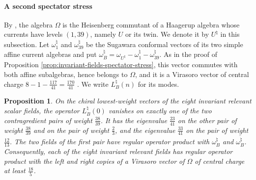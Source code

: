 \documentclass[leqno]{article}
\newtheorem{prop}[thm]{Proposition}
\numberwithin{equation}{section}
\begin{document}
\paragraph{A second spectator stress}
By \cite[Theorem 12.3(1) and (3) p.~64]{Arh26a}, the algebra $\Omega$ is the Heisenberg commutant of a Haagerup algebra whose currents have levels $(1,39)$, namely $U$ or its twin. We denote it by $U^\natural$ in this subsection. Let $\omega_1^\natural$ and $\omega_{39}^\natural$ be the Sugawara conformal vectors of its two simple affine current algebras and put $\omega_B^\natural = \omega_{U^\natural}-\omega_1^\natural-\omega_{39}^\natural$. As in the proof of Proposition \ref{prop:invariant-fields-spectator-stress}, this vector commutes with both affine subalgebras, hence belongs to $\Omega$, and it is a Virasoro vector of central charge $8-1-\frac{117}{41} = \frac{170}{41}$ \cite[Corollary 9.2 p.~26]{Arh26a}. We write $L_B^\natural(n)$ for its modes.

\begin{prop}
\label{prop:second-spectator-stress}
On the chiral lowest-weight vectors of the eight invariant relevant scalar fields, the operator $L_B^\natural(0)$ vanishes on exactly one of the two contragredient pairs of weight $\frac{38}{39}$. It has the eigenvalue $\frac{23}{41}$ on the other pair of weight $\frac{38}{39}$ and on the pair of weight $\frac23$, and the eigenvalue $\frac{33}{41}$ on the pair of weight $\frac{12}{13}$. The two fields of the first pair have regular operator product with $\omega_B^\natural$ and $\overline{\omega_B^\natural}$. Consequently, each of the eight invariant relevant fields has regular operator product with the left and right copies of a Virasoro vector of $\Omega$ of central charge at least $\frac{18}{5}$.
\end{prop}
\end{document}
